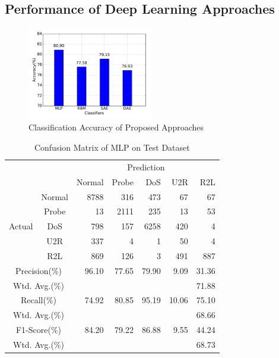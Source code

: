 \subsection{Performance of Deep Learning Approaches}

\begin{figure}[h]
    \centering
    \includegraphics[width=0.48\textwidth]{figures/comp_accuracy.pdf}
    \caption{Classification Accuracy of Proposed Approaches}
    \label{Fig:CompAccuracy}
\end{figure}

\begin{table}[t]
    \caption{Confusion Matrix of MLP on Test Dataset}
    \centering
    \begin{tabular}{cc|rrrrr}
        \hline
        &  & \multicolumn{5}{c}{Prediction} \\
                        &        & Normal & Probe & DoS & U2R & R2L\\
        \hline
        \hline
        \multirow{5}{*}{Actual} & Normal & 8788 &  316 &  473 &  67 &   67 \\
                                &  Probe &   13 & 2111 &  235 &  13 &   53 \\
                                &  DoS   &  798 &  157 & 6258 & 420 &    4 \\
                                &  U2R   &  337 &    4 &    1 &  50 &    4 \\
                                &  R2L   &  869 &  126 &    3 & 491 &  887 \\
        \hline
        \multicolumn{2}{c|}{Precision(\%)}   & 96.10& 77.65& 79.90&  9.09& 31.36\\
        \multicolumn{2}{c|}{Wtd. Avg.(\%)}   & \multicolumn{5}{r}{71.88}\\
        \hline
        \multicolumn{2}{c|}{Recall(\%)}      & 74.92& 80.85& 95.19& 10.06& 75.10 \\
        \multicolumn{2}{c|}{Wtd. Avg.(\%)}   & \multicolumn{5}{r}{68.66}\\
        \hline
        \multicolumn{2}{c|}{F1-Score(\%)}    & 84.20& 79.22& 86.88&  9.55& 44.24 \\
        \multicolumn{2}{c|}{Wtd. Avg.(\%)}   & \multicolumn{5}{r}{68.73}\\
        \hline
    \end{tabular}
\end{table}


